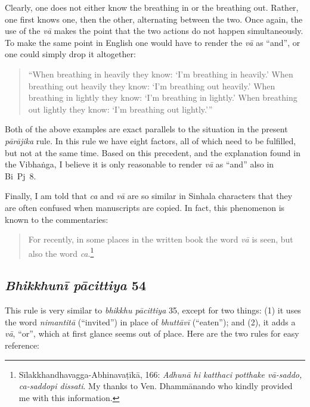 \documentclass[12pt,openany]{book}%
\begin{document}
Clearly, one does not either know the breathing in or the breathing out. Rather, one first knows one, then the other, alternating between the two. Once again, the use of the \textit{\textsanskrit{vā}} makes the point that the two actions do not happen simultaneously. To make the same point in English one would have to render the \textit{\textsanskrit{vā}} as “and”, or one could simply drop it altogether:

\begin{quotation}%
“When breathing in heavily they know: ‘I’m breathing in heavily.’ When breathing out heavily they know: ‘I’m breathing out heavily.’ When breathing in lightly they know: ‘I’m breathing in lightly.’ When breathing out lightly they know: ‘I’m breathing out lightly.’”

%
\end{quotation}

Both of the above examples are exact parallels to the situation in the present \textit{\textsanskrit{pārājika}} rule. In this rule we have eight factors, all of which need to be fulfilled, but not at the same time. Based on this precedent, and the explanation found in the \textsanskrit{Vibhaṅga}, I believe it is only reasonable to render \textit{\textsanskrit{vā}} as “and” also in Bi Pj 8.

Finally, I am told that \textit{ca} and \textit{\textsanskrit{vā}} are so similar in Sinhala characters that they are often confused when manuscripts are copied. In fact, this phenomenon is known to the commentaries:

\begin{quotation}%
For recently, in some places in the written book the word \textit{\textsanskrit{vā}} is seen, but also the word \textit{ca}.\footnote{\textsanskrit{Sīlakkhandhavagga}-\textsanskrit{Abhinavaṭīkā}, 166: \textit{\textsanskrit{Adhunā} hi katthaci potthake \textsanskrit{vā}-saddo, ca-saddopi dissati}. My thanks to Ven. \textsanskrit{Dhammānando} who kindly provided me with this information. }

%
\end{quotation}

\subsection*{\textit{\textsanskrit{Bhikkhunī} \textsanskrit{pācittiya}} 54}

This rule is very similar to \textit{bhikkhu \textsanskrit{pācittiya}} 35, except for two things: (1) it uses the word \textit{\textsanskrit{nimantitā}} (“invited”) in place of \textit{\textsanskrit{bhuttāvī}} (“eaten”); and (2), it adds a \textit{\textsanskrit{vā}}, “or”, which at first glance seems out of place. Here are the two rules for easy reference:
\end{document}
